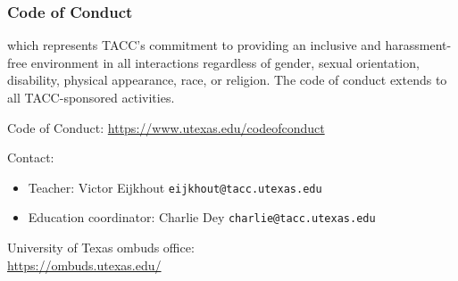 
\begin{frame}\frametitle{Code of Conduct}
  \scriptsize
  which represents TACC's commitment to providing an inclusive and
  harassment-free environment in all interactions regardless of
  gender, sexual orientation, disability, physical appearance, race,
  or religion. The code of conduct extends to all TACC-sponsored
  activities.

  Code of Conduct: \url{https://www.utexas.edu/codeofconduct}

  Contact:
  \begin{itemize}
  \item Teacher: Victor Eijkhout \texttt{eijkhout@tacc.utexas.edu}\\
  \item Education coordinator: Charlie Dey  \texttt{charlie@tacc.utexas.edu}
  \end{itemize}

  University of Texas ombuds office:\\
  \url{https://ombuds.utexas.edu/}
\end{frame}
